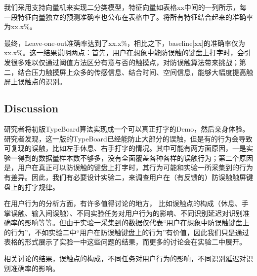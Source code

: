 我们采用支持向量机来实现二分类模型，特征向量如表格xx中间的一列所示，每一段特征向量独立的预测准确率也公布在表格中了。将所有特征结合起来的准确率为xx.x\%。

最终，Leave-one-out准确率达到了xx.x\%，相比之下，baseline[xx]的准确率仅为xx.x\%。这一结果说明两点：首先，用户在想象中能防误触的键盘上打字时，会引发很多难以仅通过阈值方法区分有意与否的触摸点，对防误触算法带来挑战；第二，结合压力触摸屏上众多的传感信息、结合时间、空间信息，能够大幅度提高触屏上误触点的识别。

\subsection{Discussion}

研究者将初版TypeBoard算法实现成一个可以真正打字的Demo，然后亲身体验。研究者发现，这一版的TypeBoard已经能防止大部分的误触，但是有的行为会导致可复现的误触，比如左手休息、右手打字的情况。其中可能有两方面原因，一是实验一得到的数据量样本数不够多，没有全面覆盖各种各样的误触行为；第二个原因是，用户在真正可以防误触的键盘上打字时，其行为可能和实验一所采集到的行为有差异。因此，我们有必要设计实验二，来调查用户在（有反馈的）防误触触屏键盘上的打字规律。

在用户行为的分析方面，有许多值得讨论的地方， 比如误触点的构成（休息、手掌误触、输入间误触）、不同实验任务对用户行为的影响、不同识别延迟对识别准确率的影响等等。但由于实验一采集到的数据仅代表“用户在想象中防误触键盘上的行为”，不如实验二中“用户在防误触键盘上的行为”有价值，因此我们只是通过表格的形式展示了实验一中这些问题的结果，而更多的讨论会在实验二中展开。

相关讨论的结果，误触点的构成，不同任务对用户行为的影响，不同识别延迟对识别准确率的影响。
